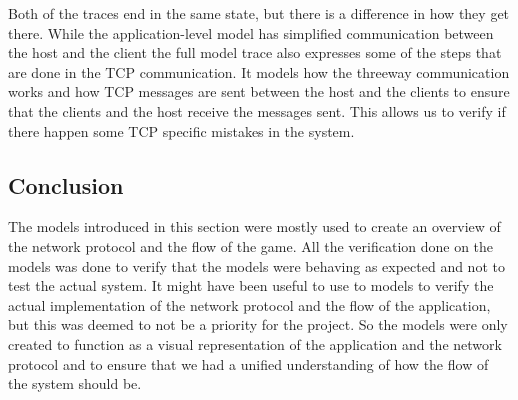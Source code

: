 Both of the traces end in the same state, but there is a difference in how they get there.
While the application-level model has simplified communication between the host and the client the full model trace also expresses some of the steps that are done in the TCP communication.
It models how the threeway communication works and how TCP messages are sent between the host and the clients to ensure that the clients and the host receive the messages sent.
This allows us to verify if there happen some TCP specific mistakes in the system.
\subsection{Conclusion}
The models introduced in this section were mostly used to create an overview of the network protocol and the flow of the game.
All the verification done on the models was done to verify that the models were behaving as expected and not to test the actual system.
It might have been useful to use to models to verify the actual implementation of the network protocol and the flow of the application, but this was deemed to not be a priority for the project.
So the models were only created to function as a visual representation of the application and the network protocol and to ensure that we had a unified understanding of how the flow of the system should be.